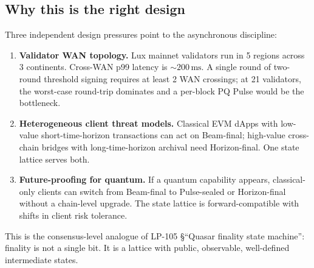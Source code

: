 \subsection{Why this is the right design}

Three independent design pressures point to the asynchronous discipline:

\begin{enumerate}[leftmargin=2em,nosep]
  \item \textbf{Validator WAN topology.} Lux mainnet validators run in 5 regions across 3 continents. Cross-WAN p99 latency is $\sim 200\,\mathrm{ms}$. A single round of two-round threshold signing requires at least 2 WAN crossings; at 21 validators, the worst-case round-trip dominates and a per-block PQ Pulse would be the bottleneck.
  \item \textbf{Heterogeneous client threat models.} Classical EVM dApps with low-value short-time-horizon transactions can act on Beam-final; high-value cross-chain bridges with long-time-horizon archival need Horizon-final. One state lattice serves both.
  \item \textbf{Future-proofing for quantum.} If a quantum capability appears, classical-only clients can switch from Beam-final to Pulse-sealed or Horizon-final without a chain-level upgrade. The state lattice is forward-compatible with shifts in client risk tolerance.
\end{enumerate}

This is the consensus-level analogue of LP-105 \cite{lp105} \S``Quasar finality state machine'': finality is not a single bit. It is a lattice with public, observable, well-defined intermediate states.
